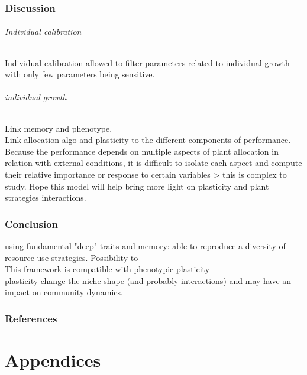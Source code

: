 \documentclass[review]{elsarticle}
\begin{document}
\section{Discussion}
\paragraph{Individual calibration}
Individual calibration allowed to filter parameters related to individual growth with only few parameters being sensitive.\\

\paragraph{individual growth}
Link memory and phenotype.\\
Link allocation algo and plasticity to the different components of performance.\\
Because the performance depends on multiple aspects of plant allocation in relation with external conditions, it is difficult to isolate each aspect and compute their relative importance or response to certain variables > this is complex to study. Hope this model will help bring more light on plasticity and plant strategies interactions.



\section{Conclusion}
using fundamental "deep" traits and memory: able to reproduce a diversity of resource use strategies. Possibility to \\
This framework is compatible with phenotypic plasticity\\
plasticity change the niche shape (and probably interactions) and may have an impact on community dynamics.


\section*{References}


\part*{Appendices}

\end{document}

